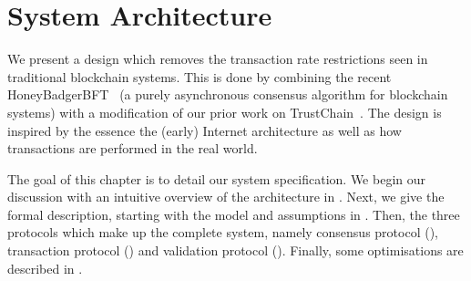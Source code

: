 \chapter{System Architecture}
\label{ch:model}






We present a design which removes the transaction rate restrictions seen in traditional blockchain systems.
This is done by combining the recent HoneyBadgerBFT~\cite{miller2016honey}
(a purely asynchronous consensus algorithm for blockchain systems)
with a modification of our prior work on TrustChain~\cite{trustchain}.
The design is inspired by the essence the (early) Internet architecture as well as how transactions are performed in the real world.
    
The goal of this chapter is to detail our system specification.
We begin our discussion with an intuitive overview of the architecture in .
Next, we give the formal description, starting with the model and assumptions in .
Then, the three protocols which make up the complete system,
namely consensus protocol (), transaction protocol () and validation protocol ().
Finally, some optimisations are described in .

